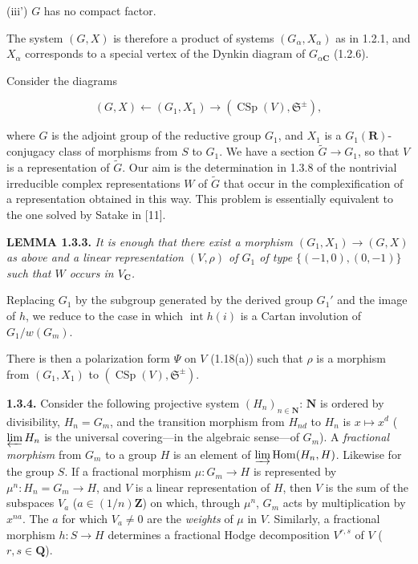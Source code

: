 \documentclass[10pt,a4paper]{article}
\newcommand{\SourcePage}[2]{\clearpage\setcounter{page}{#2}\typeout{D031_SOURCE_PAGE physical=#1 printed=#2}}
\begin{document}
\SourcePage{14}{260}
(iii') \(G\) has no compact factor.

The system \((G,X)\) is therefore a product of systems \((G_\alpha,X_\alpha)\) as in 1.2.1, and \(X_\alpha\) corresponds to a special vertex of the Dynkin diagram of \(G_{\alpha\mathbf C}\) (1.2.6).

Consider the diagrams

\[
(G,X)\longleftarrow(G_1,X_1)\longrightarrow(\operatorname{CSp}(V),\mathfrak S^{\pm}),
\]

where \(G\) is the adjoint group of the reductive group \(G_1\), and \(X_1\) is a \(G_1(\mathbf R)\)-conjugacy class of morphisms from \(S\) to \(G_1\). We have a section \(\widetilde G\to G_1\), so that \(V\) is a representation of \(\widetilde G\). Our aim is the determination in 1.3.8 of the nontrivial irreducible complex representations \(W\) of \(\widetilde G\) that occur in the complexification of a representation obtained in this way. This problem is essentially equivalent to the one solved by Satake in {[}11{]}.

\textbf{LEMMA 1.3.3.} \emph{It is enough that there exist a morphism \((G_1,X_1)\to(G,X)\) as above and a linear representation \((V,\rho)\) of \(G_1\) of type \(\{(-1,0),(0,-1)\}\) such that \(W\) occurs in \(V_{\mathbf C}\).}

Replacing \(G_1\) by the subgroup generated by the derived group \(G_1'\) and the image of \(h\), we reduce to the case in which \(\operatorname{int}h(i)\) is a Cartan involution of \(G_1/w(G_m)\).

There is then a polarization form \(\Psi\) on \(V\) (1.18(a)) such that \(\rho\) is a morphism from \((G_1,X_1)\) to \((\operatorname{CSp}(V),\mathfrak S^{\pm})\).

\textbf{1.3.4.} Consider the following projective system \((H_n)_{n\in\mathbf N}\): \(\mathbf N\) is ordered by divisibility, \(H_n=G_m\), and the transition morphism from \(H_{nd}\) to \(H_n\) is \(x\mapsto x^d\) (\(\varprojlim H_n\) is the universal covering---in the algebraic sense---of \(G_m\)). A \emph{fractional morphism} from \(G_m\) to a group \(H\) is an element of \(\varinjlim\operatorname{Hom}(H_n,H)\). Likewise for the group \(S\). If a fractional morphism \(\mu:G_m\to H\) is represented by \(\mu^n:H_n=G_m\to H\), and \(V\) is a linear representation of \(H\), then \(V\) is the sum of the subspaces \(V_a\) (\(a\in(1/n)\mathbf Z\)) on which, through \(\mu^n\), \(G_m\) acts by multiplication by \(x^{na}\). The \(a\) for which \(V_a\ne0\) are the \emph{weights} of \(\mu\) in \(V\). Similarly, a fractional morphism \(h:S\to H\) determines a fractional Hodge decomposition \(V^{r,s}\) of \(V\) (\(r,s\in\mathbf Q\)).
\end{document}
